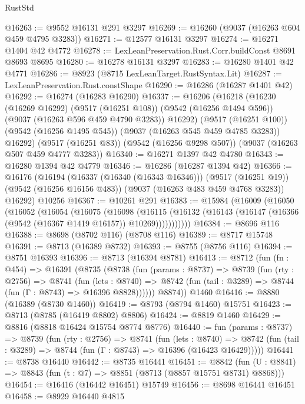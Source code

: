\begin{lexlean}{RustStd}
\begin{coremodule}
@16263 := @9552 @16131 @291 @3297
@16269 := @16260 (@9037 (@16263 @604 @459 @4795 @3283))
@16271 := @12577 @16131 @3297
@16274 := @16271 @1404 @42 @4772
@16278 := LexLeanPreservation.Rust.Corr.buildConst @8691 @8693 @8695
@16280 := @16278 @16131 @3297
@16283 := @16280 @1401 @42 @4771
@16286 := @8923 (@8715 LexLeanTarget.RustSyntax.Lit)
@16287 := LexLeanPreservation.Rust.constShape
@16290 := @16286 (@16287 @1401 @42)
@16292 := @16274 (@16283 @16290)
@16337 := @16206
    (@16218
      (@16230
        (@16269 @16292)
        (@9517 (@16251 @108))
        (@9542 (@16256 @1494 @596))
        (@9037 (@16263 @596 @459 @4790 @3283))
        @16292)
      (@9517 (@16251 @100))
      (@9542 (@16256 @1495 @545))
      (@9037 (@16263 @545 @459 @4785 @3283))
      @16292)
    (@9517 (@16251 @83))
    (@9542 (@16256 @9298 @507))
    (@9037 (@16263 @507 @459 @4777 @3283))
@16340 := @16271 @1397 @42 @4780
@16343 := @16280 @1394 @42 @4779
@16346 := @16286 (@16287 @1394 @42)
@16366 := @16176
    (@16194
      (@16337 (@16340 (@16343 @16346)))
      (@9517 (@16251 @19))
      (@9542 (@16256 @16156 @483))
      (@9037 (@16263 @483 @459 @4768 @3283))
      @16292)
    @10256
@16367 := @10261 @291
@16383 := @15984
    (@16009
      (@16050
        (@16052
          (@16054
            (@16075
              (@16098
                (@16115
                  (@16132 (@16143 (@16147 (@16366 (@9542 (@16367 @1419 @16157)) @10269)))))))))))
@16384 := @8696 @116
@16388 := @8698 (@8702 @116) (@8708 @116)
@16389 := @8717 @15748
@16391 := @8713 (@16389 @8732)
@16393 := @8755 (@8756 @116)
@16394 := @8751 @16393
@16396 := @8713 (@16394 @8781)
@16413 := @8712
    (fun (fn : @454) =>
    @16391
      (@8735
        (@8738
          (fun (params : @8737) =>
          @8739
            (fun (rty : @2756) =>
            @8741
              (fun (lets : @8740) =>
              @8742 (fun (tail : @3289) => @8744 (fun (Γ : @8743) => @16396 @8828))))))
        @8874))
    @1460
@16416 := @8880 (@16389 (@8730 @1460))
@16419 := @8793 (@8794 @1460) @15751
@16423 := @8713 (@8785 (@16419 @8802) @8806)
@16424 := @8819 @1460
@16429 := @8816 (@8818 @16424 @15754 @8774 @8776)
@16440 := fun (params : @8737) =>
  @8739
    (fun (rty : @2756) =>
    @8741
      (fun (lets : @8740) =>
      @8742 (fun (tail : @3289) => @8744 (fun (Γ : @8743) => @16396 (@16423 @16429)))))
@16441 := @8738 @16440
@16442 := @8735 @16441
@16451 := @8842
    (fun (U : @8841) => @8843 (fun (t : @7) => @8851 (@8713 (@8857 @15751 @8731) @8868)))
@16454 := @16416 (@16442 @16451) @15749
@16456 := @8698 @16441 @16451
@16458 := @8929 @16440 @4815

\end{coremodule}
\end{lexlean}
